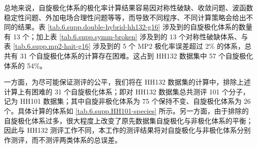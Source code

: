 总地来说，自旋极化体系的极化率计算结果容易因对称性破缺、收敛问题、波函数稳定性问题、外加电场合理性问题等等，而导致不同程序、不同计算策略会给出不同的结果。表 \ref{tab.6.supp.double-hybrid-hh132-g16} 涉及到的自旋极化体系的数量有 13 个；加上表 \ref{tab.6.supp.symm-broken} 涉及到的 13 个对称性破缺体系、与表 \ref{tab.6.supp.mp2-hait-g16} 涉及到的 5 个 MP2 极化率误差超过 2\% 的体系，总共有 31 个自旋极化体系的计算存在困难。这占到 HH132 数据集中 57 个自旋极化体系的 54\%。

一方面，为尽可能保证测评的公平，我们将在 HH132 数据集的计算中，排除上述计算上有困难的 31 个自旋极化体系；即对 HH132 数据集总共测评 101 个分子，记为 HH101 数据集；其中自旋非极化体系为 75 个保持不变、自旋极化体系为 26 个。具体计算的体系如 \ref{tab.6.supp.HH101-species} 所示。另一方面，由于排除的自旋极化体系过多，很大程度上改变了原先数据集自旋极化与非极化体系的平衡；因此与 HH132 测评工作\cite{Hait-Head-Gordon.PCCP.2018}不同，本工作的测评结果将对自旋极化与非极化体系分别作测评，而不测评两类体系的总误差。

